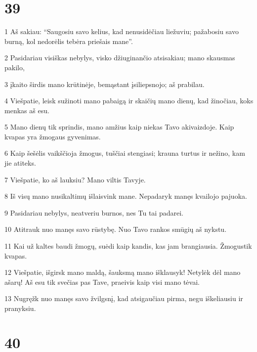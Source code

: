 \chapter{39}


\par 1 Aš sakiau: “Saugosiu savo kelius, kad nenusidėčiau liežuviu; pažabosiu savo burną, kol nedorėlis tebėra priešais mane”. 
\par 2 Pasidariau visiškas nebylys, visko džiuginančio atsisakiau; mano skausmas pakilo, 
\par 3 įkaito širdis mano krūtinėje, bemąstant įsiliepsnojo; aš prabilau. 
\par 4 Viešpatie, leisk sužinoti mano pabaigą ir skaičių mano dienų, kad žinočiau, koks menkas aš esu. 
\par 5 Mano dienų tik sprindis, mano amžius kaip niekas Tavo akivaizdoje. Kaip kvapas yra žmogaus gyvenimas. 
\par 6 Kaip šešėlis vaikščioja žmogus, tuščiai stengiasi; krauna turtus ir nežino, kam jie atiteks. 
\par 7 Viešpatie, ko aš lauksiu? Mano viltis Tavyje. 
\par 8 Iš visų mano nusikaltimų išlaisvink mane. Nepadaryk manęs kvailojo pajuoka. 
\par 9 Pasidariau nebylys, neatveriu burnos, nes Tu tai padarei. 
\par 10 Atitrauk nuo manęs savo rūstybę. Nuo Tavo rankos smūgių aš nykstu. 
\par 11 Kai už kaltes baudi žmogų, suėdi kaip kandis, kas jam brangiausia. Žmogus­tik kvapas. 
\par 12 Viešpatie, išgirsk mano maldą, šauksmą mano išklausyk! Netylėk dėl mano ašarų! Aš esu tik svečias pas Tave, praeivis kaip visi mano tėvai. 
\par 13 Nugręžk nuo manęs savo žvilgsnį, kad atsigaučiau pirma, negu iškeliausiu ir pranyksiu.



\chapter{40}


